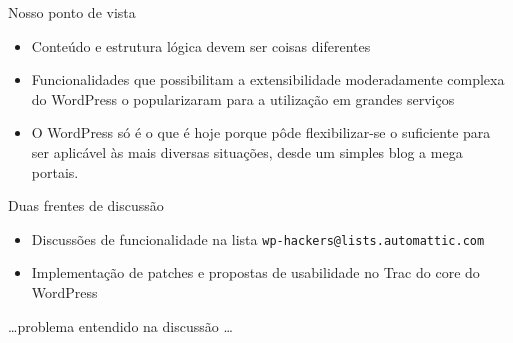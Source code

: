 \documentclass{beamer}
\begin{document}
\begin{frame}{Nosso ponto de vista}
\begin{itemize}
  \pause \item Conteúdo e estrutura lógica devem ser coisas diferentes
  \pause \item Funcionalidades que possibilitam a extensibilidade moderadamente
    complexa do WordPress o popularizaram para a utilização em grandes serviços
  \pause \item O WordPress só é o que é hoje porque pôde flexibilizar-se o
    suficiente para ser aplicável às mais diversas situações, desde um simples
    blog a mega portais.
\end{itemize}
\end{frame}

\begin{frame}{Duas frentes de discussão}
\begin{itemize}
  \pause \item Discussões de funcionalidade na lista
    \texttt{wp-hackers@lists.automattic.com}
  \pause \item Implementação de patches e propostas de usabilidade no Trac do
    core do WordPress
\end{itemize}
\end{frame}


\begin{frame}
\begin{center}
  \ldots problema entendido na discussão \ldots
\end{center}
\end{frame}
\end{document}
